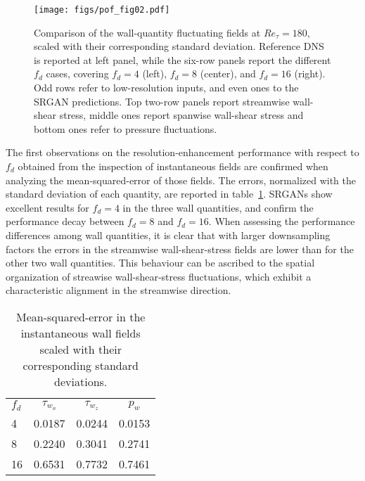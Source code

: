 \begin{figure}
  \begin{center}
  \texttt{[image: figs/pof\_fig02.pdf]}
  \end{center}
  \caption{Comparison of the wall-quantity fluctuating fields at $Re_{\tau} = 180$, scaled with their corresponding standard deviation. Reference DNS is reported at left panel, while the six-row panels report the different $f_d$ cases, covering $f_d=4$ (left), $f_d=8$ (center), and $f_d=16$ (right). Odd rows refer to low-resolution inputs, and even ones to the SRGAN predictions. Top two-row panels report streamwise wall-shear stress, middle ones report spanwise wall-shear stress and bottom ones refer to pressure fluctuations.}
\label{fig:02}
\end{figure}

The first observations on the resolution-enhancement performance with respect to $f_d$ obtained from the inspection of instantaneous fields are confirmed when analyzing the mean-squared-error of those fields.
The errors, normalized with the standard deviation of each quantity, are reported in table~\ref{tab:01}. SRGANs show excellent results for $f_d=4$ in the three wall quantities, and confirm the performance decay between $f_d=8$ and $f_d=16$.
When assessing the performance differences among wall quantities, it is clear that with larger downsampling factors the errors in the streamwise wall-shear-stress fields are lower than for the other two wall quantities.
This behaviour can be ascribed to the spatial organization of streawise  wall-shear-stress fluctuations, which exhibit a characteristic alignment in the streamwise direction.

\begin{table}
\centering
\begin{tabular}{lccc}
        $f_d$ & $\tau_{w_x}$ & $\tau_{w_z}$ & $p_w$ \\[0.4cm]

        4     & 0.0187       & 0.0244       & 0.0153 \\
        8     & 0.2240       & 0.3041       & 0.2741 \\
        16    & 0.6531       & 0.7732       & 0.7461 \\

    \end{tabular}
    \caption{Mean-squared-error in the instantaneous wall fields scaled with their corresponding standard deviations.}
    \label{tab:01}
\end{table}

